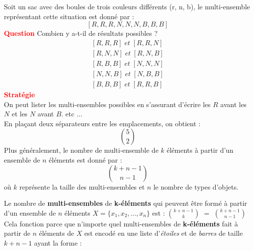 \documentclass[8pt]{report}
\begin{document}
\begin{multicols*}{2}
\begin{EExample}{}{}
    Soit un sac avec des boules de trois couleurs différents (r, n, b), le multi-ensemble 
    représentant cette situation est donné par : 
    \[\left[ R, R, R, N, N, N, B, B, B \right]\]
    \textcolor{red}{\textbf{Question}} Combien y a-t-il de résultats possibles ?
    \begin{align*}
        \left[R, R, R \right] \; et \; \left[R, R, N \right] \\
        \left[R, N, N \right] \; et \; \left[R, N, B \right] \\
        \left[R, B, B \right] \; et \; \left[N, N, N \right] \\
        \left[N, N, B \right] \; et \; \left[N, B, B \right] \\
        \left[B, B, B \right] \; et \; \left[R, R, B \right]
    \end{align*}
\textcolor{red}{\textbf{Stratégie}} \\
    On peut lister les multi-ensembles possibles en s'assurant d'écrire les 
    $R$ avant les $N$ et les $N$ avant $B$. etc ... \\
    En plaçant deux séparateurs entre les emplacements, on obtient : 
    \[ {5 \choose 2} \]
    Plus généralement, le nombre de multi-ensemble de $k$ éléments à partir d'un ensemble de $n$ 
    éléments est donné par : 
    \[ {{k+ n -1} \choose {n-1} } \]
    où $k$ représente la taille des multi-ensembles et $n$ le nombre de types d'objets. 

\end{EExample}

\begin{Definitionx*}{}{}
   Le nombre de \textbf{multi-ensembles} de  \textbf{k-éléments} qui peuvent être formé à partir 
   d'un ensemble de $n$ éléments $X = \{x_1, x_2, \dots, x_n \}$ est : 
   $ {k+n-1}\choose {k} $ $=$ ${k+n-1}\choose{n-1}$
   Cela fonction parce que n'importe quel multi-ensembles de \textbf{k-éléments} fait à partir de 
   $n$ éléments de $X$ est encodé en une liste d'\textit{étoiles} et de \textit{barres} de taille 
   $k+n -1$ ayant la forme : 



\end{Definitionx*}
\end{multicols*}
\end{document}
